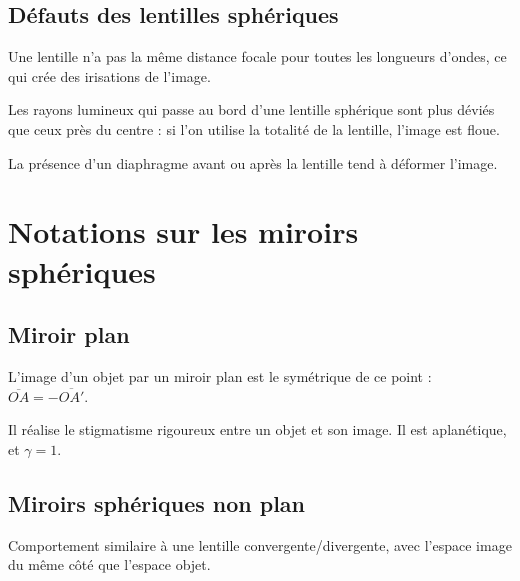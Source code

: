 \documentclass[11pt]{article}
\theoremstyle{cstyle}{\newtheorem{definition}{Définition}[section]}
\theoremstyle{cstyle}{\newtheorem{proposition}[definition]{Propriété}}
\theoremstyle{cstyle}{\newtheorem{theorem}[definition]{Théorème}}
\theoremstyle{mystyle}{\newtheorem{lemma}[definition]{Lemme}}
\theoremstyle{mystyle}{\newtheorem{corollary}[definition]{Corollaire}}
\theoremstyle{mystyle}{\newtheorem*{remark}{Remarque}}
\theoremstyle{mystyle}{\newtheorem*{remarks}{Remarques}}
\theoremstyle{mystyle}{\newtheorem*{example}{Exemple}}
\theoremstyle{mystyle}{\newtheorem*{examples}{Exemples}}
\theoremstyle{definition}{\newtheorem*{exercise}{Exercice}}
\theoremstyle{mystyle}{\newtheorem*{methode}{Méthode}}
\theoremstyle{cstyle}{\newtheorem*{cthm}{}}
\theoremstyle{warn}
\begin{document}
	\newpage
	
	\begin{minipage}[t]{0.46\textwidth}
		\subsection{Défauts des lentilles sphériques}
		
		\begin{proposition}
			Une lentille n'a pas la même distance focale pour toutes les longueurs d'ondes, ce qui crée des irisations de l'image.
		\end{proposition}
	
		\begin{proposition}
			Les rayons lumineux qui passe au bord d'une lentille sphérique sont plus déviés que ceux près du centre : si l'on utilise la totalité de la lentille, l'image est floue.
		\end{proposition}
	
		\begin{proposition}[Distorsions]
			La présence d'un diaphragme avant ou après la lentille tend à déformer l'image.
		\end{proposition}
	\end{minipage}
	\hfill
	\begin{minipage}[t]{0.46\textwidth}
		\section{Notations sur les miroirs sphériques}
		
		\subsection{Miroir plan}
		
		\begin{proposition}
			L'image d'un objet par un miroir plan est le symétrique de ce point : \(\overline{OA} = - \overline{OA'}\).
		\end{proposition}
	
		\begin{proposition}
			Il réalise le stigmatisme rigoureux entre un objet et son image. Il est aplanétique, et \(\gamma = 1\).
		\end{proposition}
	
		\subsection{Miroirs sphériques non plan}
		
		\begin{proposition}
			Comportement similaire à une lentille convergente/divergente, avec l'espace image du même côté que l'espace objet.
		\end{proposition}

	\end{minipage}
\end{document}
